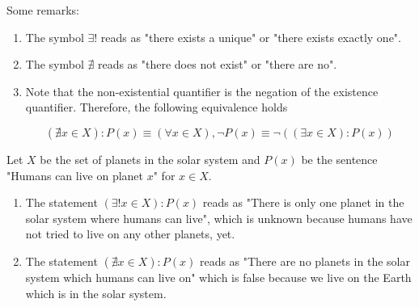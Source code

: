 \begin{remark} Some remarks:

    \begin{enumerate}
        \item The symbol $\exists!$ reads as "there exists a unique" or "there exists exactly one".

        \item The symbol $\nexists$ reads as "there does not exist" or "there are no".

        \item Note that the non-existential quantifier is the negation of the existence quantifier. Therefore, the following equivalence holds

            $$
            (\nexists x \in X) : P(x) \equiv (\forall x \in X), \neg P(x) \equiv \neg((\exists x \in X) : P(x))
            $$
    \end{enumerate}
\end{remark}

\begin{example}
    Let $X$ be the set of planets in the solar system and $P(x)$ be the sentence "Humans can live on planet $x$" for $x \in X$.

    \begin{enumerate}
        \item The statement $(\exists! x \in X): P(x)$ reads as "There is only one planet in the solar system where humans can live", which is unknown because humans have not tried to live on any other planets, yet.

        \item The statement $(\nexists x \in X): P(x)$ reads as "There are no planets in the solar system which humans can live on" which is false because we live on the Earth which is in the solar system.
    \end{enumerate}
\end{example}
